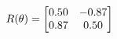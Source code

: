 \documentclass[preview]{standalone}
\begin{document}
\begin{align*}
\special{dvisvgm:raw <g id='unique000'>}R(\theta) = \begin{bmatrix}0.50 & -0.87\\0.87 & 0.50\end{bmatrix}\special{dvisvgm:raw </g>}
\end{align*}
\end{document}
